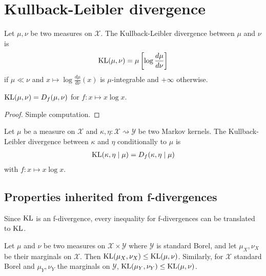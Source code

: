 \chapter{Kullback-Leibler divergence}

\begin{definition}
  \label{def:KL}
  \leanok
  Let $\mu, \nu$ be two measures on $\mathcal X$. The Kullback-Leibler divergence between $\mu$ and $\nu$ is
  \begin{align*}
  \mathrm{KL}(\mu, \nu) = \mu\left[\log \frac{d \mu}{d \nu}\right]
  \end{align*}
  if $\mu \ll \nu$ and $x \mapsto \log \frac{d \mu}{d \nu}(x)$ is $\mu$-integrable and $+\infty$ otherwise.
\end{definition}

\begin{lemma}
  \label{lem:kl_eq_fDiv}
  \leanok
  $\mathrm{KL}(\mu, \nu) = D_f(\mu, \nu)$ for $f: x \mapsto x \log x$.
\end{lemma}

\begin{proof}\leanok
Simple computation.
\end{proof}

\begin{definition}
  \label{def:condKL}
  Let $\mu$ be a measure on $\mathcal X$ and $\kappa, \eta : \mathcal X \rightsquigarrow \mathcal Y$ be two Markov kernels. The Kullback-Leibler divergence between $\kappa$ and $\eta$ conditionally to $\mu$ is
  \begin{align*}
  \mathrm{KL}(\kappa, \eta \mid \mu) = D_f(\kappa, \eta \mid \mu)
  \end{align*}
  with $f: x \mapsto x \log x$.
\end{definition}

\section{Properties inherited from f-divergences}

Since $\mathrm{KL}$ is an f-divergence, every inequality for f-divergences can be translated to $\mathrm{KL}$.

\begin{theorem}[Marginals]
  \label{thm:kl_fst_le}
  Let $\mu$ and $\nu$ be two measures on $\mathcal X \times \mathcal Y$ where $\mathcal Y$ is standard Borel, and let $\mu_X, \nu_X$ be their marginals on $\mathcal X$.
  Then $\mathrm{KL}(\mu_X, \nu_X) \le \mathrm{KL}(\mu, \nu)$.
  Similarly, for $\mathcal X$ standard Borel and $\mu_Y, \nu_Y$ the marginals on $\mathcal Y$, $\mathrm{KL}(\mu_Y, \nu_Y) \le \mathrm{KL}(\mu, \nu)$.
\end{theorem}

